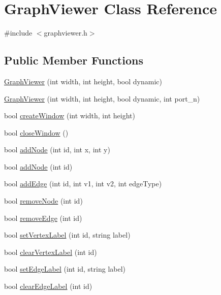 \hypertarget{class_graph_viewer}{}\section{Graph\+Viewer Class Reference}
\label{class_graph_viewer}


{\ttfamily \#include $<$graphviewer.\+h$>$}

\subsection*{Public Member Functions}
\begin{DoxyCompactItemize}
\item 
\hyperlink{class_graph_viewer_a8adc614f4fc290a3efcec7d7ceb1c58a}{Graph\+Viewer} (int width, int height, bool dynamic)
\item 
\hyperlink{class_graph_viewer_ad9d7b1d8b4ba8ef18517eae0e68568a2}{Graph\+Viewer} (int width, int height, bool dynamic, int port\+\_\+n)
\item 
bool \hyperlink{class_graph_viewer_ae5247dc66449dcd21fc5d531bbbaddfa}{create\+Window} (int width, int height)
\item 
bool \hyperlink{class_graph_viewer_a85990c1eaac7feed3950960d4bd2fd4c}{close\+Window} ()
\item 
bool \hyperlink{class_graph_viewer_a5421e86ac76433876309236ba96e70a2}{add\+Node} (int id, int x, int y)
\item 
bool \hyperlink{class_graph_viewer_ab9be856eb5f45284719a3bb119ec01ea}{add\+Node} (int id)
\item 
bool \hyperlink{class_graph_viewer_aad0c1448c37f744209ffb671f1bd0015}{add\+Edge} (int id, int v1, int v2, int edge\+Type)
\item 
bool \hyperlink{class_graph_viewer_a0c418639bb911eb827cabf895915f775}{remove\+Node} (int id)
\item 
bool \hyperlink{class_graph_viewer_a9a8ee68c7c12b373affbe4069dd95d72}{remove\+Edge} (int id)
\item 
bool \hyperlink{class_graph_viewer_ac25d7d007022fda16799808ba136e909}{set\+Vertex\+Label} (int id, string label)
\item 
bool \hyperlink{class_graph_viewer_a007bd78a6959ac37119eb18a8e8bca4c}{clear\+Vertex\+Label} (int id)
\item 
bool \hyperlink{class_graph_viewer_a447cca0064e785654c2105602c2961ca}{set\+Edge\+Label} (int id, string label)
\item 
bool \hyperlink{class_graph_viewer_a8b90527371bd990806eb32620be765be}{clear\+Edge\+Label} (int id)

\end{DoxyCompactItemize}
